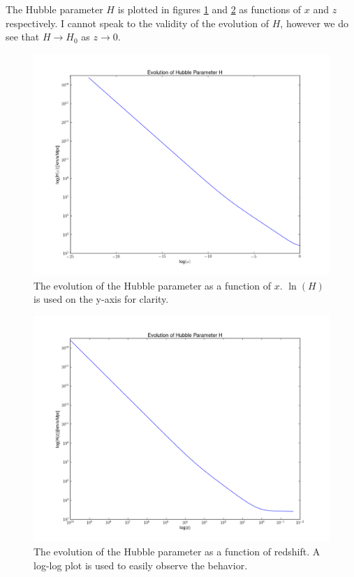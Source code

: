\documentclass[a4paper]{article}
\begin{document}
The Hubble parameter $H$ is plotted in figures \ref{fig:hx} and \ref{fig:hz} as functions of $x$ and $z$ respectively. I cannot speak to the validity of the evolution of $H$, however we do see that $H \rightarrow H_0$ as $z \rightarrow 0$. 
\begin{center}
\begin{figure}[ht!]\label{fig:hx}
\includegraphics[scale=0.35]{hx}
\caption{The evolution of the Hubble parameter as a function of $x$. $\ln(H)$ is used on the y-axis for clarity.}
\end{figure}

\begin{figure}[h!]\label{fig:hz}
\centering
\includegraphics[scale=0.35]{hz}
\caption{The evolution of the Hubble parameter as a function of redshift. A log-log plot is used to easily observe the behavior.}
\end{figure}
\end{center}
\end{document}
